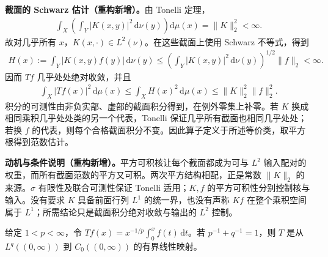 \documentclass[../../main.tex]{subfiles}
\begin{document}
\begin{solution}
\textbf{截面的 Schwarz 估计（重构新增）。}由 Tonelli 定理，
\begin{align*}
\int_X\left(\int_Y|K(x,y)|^2\,\mathrm d\nu(y)\right)\mathrm d\mu(x)=\|K\|_2^2<\infty.
\end{align*}
故对几乎所有 $x$，$K(x,\cdot)\in L^2(\nu)$。在这些截面上使用 Schwarz 不等式，得到
\begin{align*}
H(x):=\int_Y|K(x,y)f(y)|\,\mathrm d\nu(y)
\leqslant\left(\int_Y|K(x,y)|^2\,\mathrm d\nu(y)\right)^{1/2}\|f\|_2<\infty.
\end{align*}
因而 $Tf$ 几乎处处绝对收敛，并且
\begin{align*}
\int_X|Tf(x)|^2\,\mathrm d\mu(x)\leqslant\int_XH(x)^2\,\mathrm d\mu(x)
\leqslant\|K\|_2^2\|f\|_2^2.
\end{align*}
积分的可测性由非负实部、虚部的截面积分得到，在例外零集上补零。若 $K$ 换成相同乘积几乎处处类的另一个代表，Tonelli 保证几乎所有截面也相同几乎处处；若换 $f$ 的代表，则每个合格截面积分不变。因此算子定义于所述等价类，取平方根得到范数估计。
\end{solution}
\begin{remark}
\textbf{动机与条件说明（重构新增）。}平方可积核让每个截面都成为可与 $L^2$ 输入配对的权重，而所有截面范数的平方又可积。两次平方结构相配，正是常数 $\|K\|_2$ 的来源。$\sigma$ 有限性及联合可测性保证 Tonelli 适用；$K,f$ 的平方可积性分别控制核与输入。没有要求 $K$ 具备前面行列 $L^1$ 的统一界，也没有声称 $Kf$ 在整个乘积空间属于 $L^1$；所需结论只是截面积分绝对收敛与输出的 $L^2$ 控制。
\end{remark}
\begin{exercise}\label{exercise:ch06-weighted-primitive-czero}
给定 $1<p<\infty$，令 $Tf(x)=x^{-1/p}\int_0^x f(t)\,\mathrm dt$。若 $p^{-1}+q^{-1}=1$，则 $T$ 是从 $L^q((0,\infty))$ 到 $C_0((0,\infty))$ 的有界线性映射。
\end{exercise}
\end{document}

